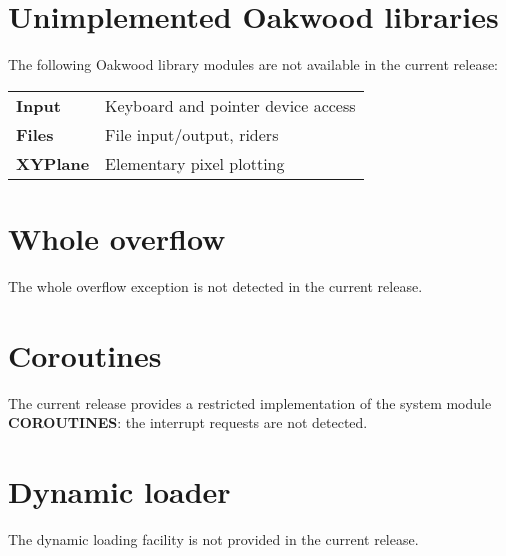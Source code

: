 \section*{Unimplemented Oakwood libraries}

The following \ot{} Oakwood library modules are not
available in the current release:
\begin{flushleft}
\begin{tabular}{lp{7cm}}
\bf Input   & Keyboard and pointer device access \\
\bf Files   & File input/output, riders          \\
\bf XYPlane & Elementary pixel plotting          \\
\end{tabular}
\end{flushleft}

\ifgenc
\section*{Whole overflow}

The whole overflow exception is not detected in the current release.
\fi

\section*{Coroutines}

The current release provides a restricted implementation of the
system module {\bf COROUTINES}: the interrupt requests are not
detected.

\section*{Dynamic loader}

The \ot{} dynamic loading facility is not provided in the current release.
